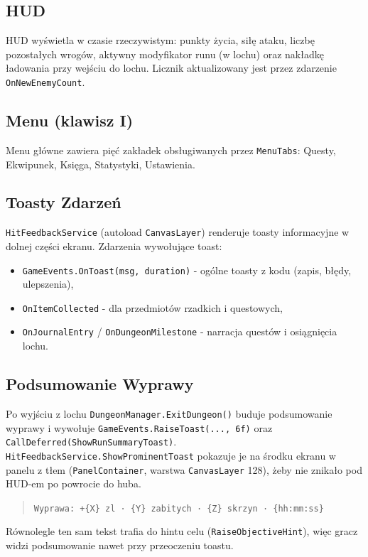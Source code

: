 \subsection{HUD}

HUD wyświetla w czasie rzeczywistym: punkty życia, siłę ataku, liczbę pozostałych wrogów, aktywny modyfikator runu (w lochu) oraz nakładkę ładowania przy wejściu do lochu. Licznik aktualizowany jest przez zdarzenie \texttt{OnNewEnemyCount}.

\subsection{Menu (klawisz I)}

Menu główne zawiera pięć zakładek obsługiwanych przez \texttt{MenuTabs}: Questy, Ekwipunek, Księga, Statystyki, Ustawienia.

\subsection{Toasty Zdarzeń}

\texttt{HitFeedbackService} (autoload \texttt{CanvasLayer}) renderuje toasty informacyjne w dolnej części ekranu. Zdarzenia wywołujące toast:
\begin{itemize}
    \item \texttt{GameEvents.OnToast(msg, duration)} - ogólne toasty z kodu (zapis, błędy, ulepszenia),
    \item \texttt{OnItemCollected} - dla przedmiotów rzadkich i questowych,
    \item \texttt{OnJournalEntry} / \texttt{OnDungeonMilestone} - narracja questów i osiągnięcia lochu.
\end{itemize}

\subsection{Podsumowanie Wyprawy}

Po wyjściu z lochu \texttt{DungeonManager.ExitDungeon()} buduje podsumowanie wyprawy i wywołuje \texttt{GameEvents.RaiseToast(..., 6f)} oraz \texttt{CallDeferred(ShowRunSummaryToast)}. \texttt{HitFeedbackService.ShowProminentToast} pokazuje je na środku ekranu w panelu z tłem (\texttt{PanelContainer}, warstwa \texttt{CanvasLayer} 128), żeby nie znikało pod HUD-em po powrocie do huba.
\begin{quote}
\texttt{Wyprawa: +\{X\} zl · \{Y\} zabitych · \{Z\} skrzyn · \{hh:mm:ss\}}
\end{quote}
Równolegle ten sam tekst trafia do hintu celu (\texttt{RaiseObjectiveHint}), więc gracz widzi podsumowanie nawet przy przeoczeniu toastu.

